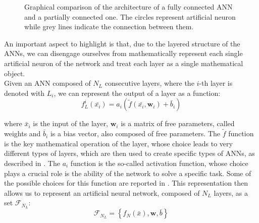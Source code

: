 \begin{figure}[h]
    \centering
    \begin{minipage}[c]{0.49\linewidth}
        \vspace{0pt}
        \centering
    \end{minipage}%
    \hfill%
    \begin{minipage}[c]{0.49\linewidth}
        \vspace{0pt}
        \centering
    \end{minipage}%
    \caption{Graphical comparison of the architecture of a fully connected ANN and a partially connected one. The circles represent artificial neuron while grey lines indicate the connection between them.}
    \label{fig:full_part_ANN}
\end{figure}

An important aspect to highlight is that, due to the layered structure of the ANNs, we can disengage ourselves from mathematically represent each single artificial neuron of the network and treat each  layer as a single mathematical object. \\
Given an ANN composed of $N_L$ consecutive layers, where the $i$-th layer is denoted with $L_i$, we can represent the output of a layer as a function:
\begin{equation}
    f_L^i (\bar{x_i})=a_i \left( \tilde{f}(\bar{x_i}, \boldsymbol{w}_i) + \bar{b}_i \right) 
    \label{eq:layer_math}
\end{equation}

where $\bar{x}_i$ is the input of the layer, $\boldsymbol{w}_i$ is a matrix of free parameters, called weights and $\bar{b}_i$ is a bias vector, also composed of free parameters. The $\tilde{f}$ function is the key mathematical operation of the layer, whose choice leads to very different types of layers, which are then used to create specific types of ANNs, as described in . The $a_i$ function is the so-called activation function, whose choice plays a crucial role is the ability of the network to solve a specific task. Some of the possible choices for this function are reported in .
This representation then allows us to represent an artificial neural network, composed of $N_L$ layers, as a set $\mathcal{F}_{N_L}$:
\begin{equation}
\mathcal{F}_{N_L} = \left\{ f_N(\bar{x}), \boldsymbol{w}, \bar{b}\right\}
\end{equation}

